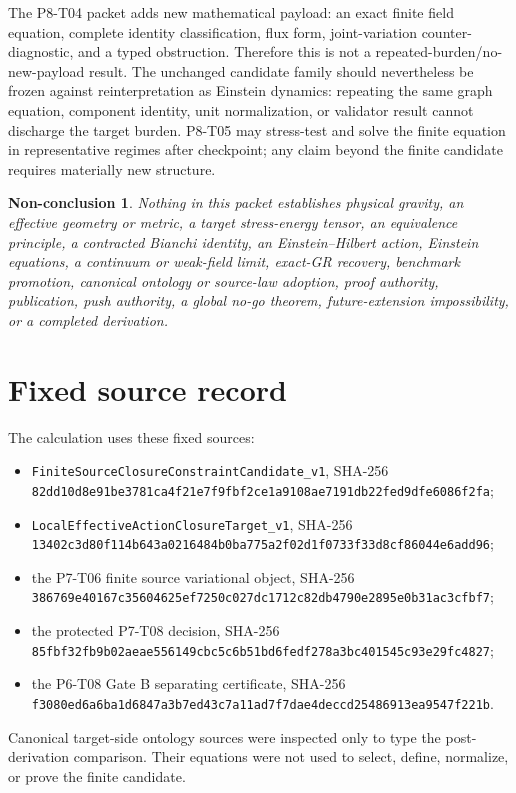 \documentclass[11pt]{article}
\newtheorem{nonconclusion}{Non-conclusion}
\begin{document}
The P8-T04 packet adds new mathematical payload: an exact finite field
equation, complete identity classification, flux form, joint-variation
counter-diagnostic, and a typed obstruction.  Therefore this is not a
repeated-burden/no-new-payload result.  The unchanged candidate family should
nevertheless be frozen against reinterpretation as Einstein dynamics:
repeating the same graph equation, component identity, unit normalization,
or validator result cannot discharge the target burden.  P8-T05 may
stress-test and solve the finite equation in representative regimes after
checkpoint; any claim beyond the finite candidate requires materially new
structure.

\begin{nonconclusion}
Nothing in this packet establishes physical gravity, an effective geometry
or metric, a target stress-energy tensor, an equivalence principle, a
contracted Bianchi identity, an Einstein--Hilbert action, Einstein equations,
a continuum or weak-field limit, exact-GR recovery, benchmark promotion,
canonical ontology or source-law adoption, proof authority, publication,
push authority, a global no-go theorem, future-extension impossibility, or a
completed derivation.
\end{nonconclusion}

\section{Fixed source record}

The calculation uses these fixed sources:
\begin{itemize}
\item \texttt{FiniteSourceClosureConstraintCandidate\_v1}, SHA-256
\texttt{82dd10d8e91be3781ca4f21e7f9fbf2ce1a9108ae7191db22fed9dfe6086f2fa};
\item \texttt{LocalEffectiveActionClosureTarget\_v1}, SHA-256
\texttt{13402c3d80f114b643a0216484b0ba775a2f02d1f0733f33d8cf86044e6add96};
\item the P7-T06 finite source variational object, SHA-256
\texttt{386769e40167c35604625ef7250c027dc1712c82db4790e2895e0b31ac3cfbf7};
\item the protected P7-T08 decision, SHA-256
\texttt{85fbf32fb9b02aeae556149cbc5c6b51bd6fedf278a3bc401545c93e29fc4827};
\item the P6-T08 Gate B separating certificate, SHA-256
\texttt{f3080ed6a6ba1d6847a3b7ed43c7a11ad7f7dae4deccd25486913ea9547f221b}.
\end{itemize}
Canonical target-side ontology sources were inspected only to type the
post-derivation comparison.  Their equations were not used to select, define,
normalize, or prove the finite candidate.
\end{document}
